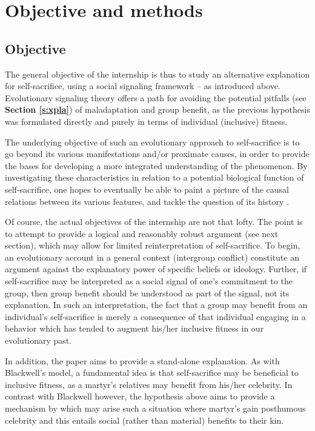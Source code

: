 \documentclass[a4paper,12pt]{report}
\begin{document}
\section{Objective and methods}
\subsection{Objective}
\label{s:objective}
The general objective of the internship is thus to study an alternative explanation
for self-sacrifice, using a social signaling framework – as introduced above.
Evolutionary signaling theory offers a path for avoiding the potential pitfalls
(see \textbf{Section \ref{s:xpla}}) of maladaptation
and group benefit, as the previous hypothesis
was formulated directly and purely in terms of individual (inclusive) fitness.

The underlying objective of such an evolutionary approach to self-sacrifice is
to go beyond its various manifestations and/or proximate causes,
in order to provide the bases for developing a more integrated understanding
of the phenomenon. By investigating these characteristics in relation to a potential
biological function of self-sacrifice, one hopes to eventually
be able to paint a picture of the causal relations between its various features,
and tackle the question of its history \cite{tinbergen_aims_2010}.

Of course, the actual objectives of the internship are not that lofty.
The point is to attempt to provide a logical and reasonably robust argument
(see next section), which may allow for limited reinterpretation of self-sacrifice.
To begin, an evolutionary account in a general context (intergroup conflict)
constitute an argument against the explanatory power of specific beliefs or ideology.
Further, if self-sacrifice may be interpreted as a social signal of one’s
commitment to the group, then group benefit should be understood as part of the signal,
not its explanation. In such an interpretation, the fact that a group may benefit
from an individual’s self-sacrifice is merely a consequence of that individual
engaging in a behavior which has tended to augment his/her inclusive fitness
in our evolutionary past. 

In addition, the paper aims to provide a stand-alone explanation.
As with Blackwell’s \citeyear{blackwell_middle-class_2008} model, a fundamental idea is that self-sacrifice
may be beneficial to inclusive fitness, as a martyr’s relatives may benefit
from his/her celebrity. In contrast with Blackwell however, the hypothesis
above aims to provide a mechanism by which may arise such a situation where
martyr’s gain posthumous celebrity and this entails social (rather than material)
benefits to their kin.
\end{document}
